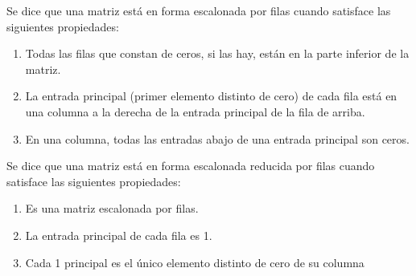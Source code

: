\documentclass[compacto,10pt]{pubciencias-notas}
\begin{document}
\begin{defi}
Se dice que una matriz está en forma escalonada por filas cuando satisface las siguientes propiedades:
\begin{enumerate}
\item Todas las filas que constan de ceros, si las hay, están en la parte inferior de la matriz. 
\item La entrada principal (primer elemento distinto de cero) de cada fila está en una columna a la derecha de la entrada principal de la fila de arriba. 
\item En una columna, todas las entradas abajo de una entrada principal son ceros.
\end{enumerate}
\end{defi}

\begin{defi}
Se dice que una matriz está en forma escalonada reducida por filas cuando satisface las siguientes propiedades:
\begin{enumerate}
\item Es una matriz escalonada por filas. 
\item La entrada principal de cada fila es 1.
\item Cada 1 principal es el único elemento distinto de cero de su columna
\end{enumerate}
\end{defi}
\end{document}
